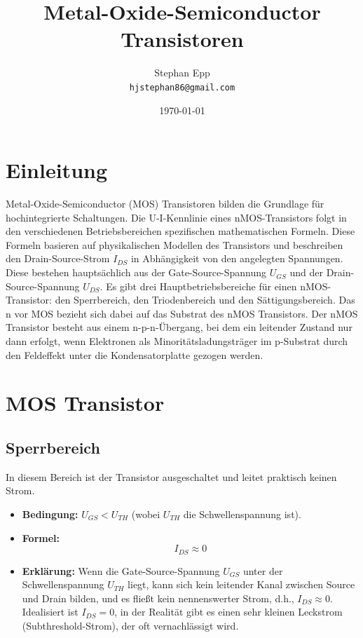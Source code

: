 \documentclass{scrarticle}
\title{Metal-Oxide-Semiconductor Transistoren}
\author{Stephan Epp\\\texttt{hjstephan86@gmail.com}}
\date{\today}
\numberwithin{equation}{section}
\begin{document}
	\maketitle
	\vspace{5em}
	\tableofcontents
	\newpage

\section{Einleitung}
Metal-Oxide-Semiconductor (MOS) Transistoren bilden die Grundlage für hochintegrierte Schaltungen. Die U-I-Kennlinie eines nMOS-Transistors folgt in den verschiedenen Betriebsbereichen spezifischen mathematischen Formeln. Diese Formeln basieren auf physikalischen Modellen des Transistors und beschreiben den Drain-Source-Strom $I_{DS}$ in Abhängigkeit von den angelegten Spannungen. Diese bestehen hauptsächlich aus der Gate-Source-Spannung $U_{GS}$ und der Drain-Source-Spannung $U_{DS}$. Es gibt drei Hauptbetriebsbereiche für einen nMOS-Transistor: den Sperrbereich, den Triodenbereich und den Sättigungsbereich. Das n vor MOS bezieht sich dabei auf das Substrat des nMOS Transistors. Der nMOS Transistor besteht aus einem n-p-n-Übergang, bei dem ein leitender Zustand nur dann erfolgt, wenn Elektronen als Minoritätsladungsträger im p-Substrat durch den Feldeffekt unter die Kondensatorplatte gezogen werden.

\section{MOS Transistor}
\subsection{Sperrbereich}
In diesem Bereich ist der Transistor ausgeschaltet und leitet praktisch keinen Strom.

\begin{itemize}
	\item \textbf{Bedingung:} $U_{GS} < U_{TH}$ (wobei $U_{TH}$ die Schwellenspannung ist).
	\item \textbf{Formel:}
	\begin{equation*}
		I_{DS} \approx 0
	\end{equation*}
	\item \textbf{Erklärung:} Wenn die Gate-Source-Spannung $U_{GS}$ unter der Schwellenspannung $U_{TH}$ liegt, kann sich kein leitender Kanal zwischen Source und Drain bilden, und es fließt kein nennenswerter Strom, d.h., $I_{DS} \approx 0$. Idealisiert ist $I_{DS} = 0$, in der Realität gibt es einen sehr kleinen Leckstrom (Subthreshold-Strom), der oft vernachlässigt wird.
\end{itemize}
\end{document}
